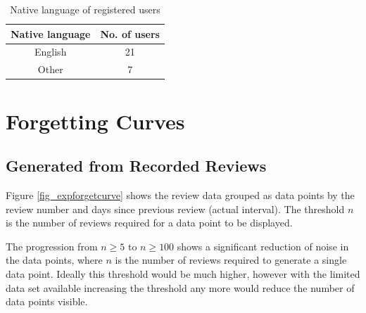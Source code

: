 \begin{table}[h!]
\caption{Native language of registered users}
\begin{tabular}{|c|c|}
\hline
Native language & No. of users \\
\hline
English & 21 \\
Other & 7 \\
\hline
\end{tabular}
\end{table}

\section{Forgetting Curves}
\subsection*{Generated from Recorded Reviews}

Figure \ref{fig_expforgetcurve} shows the review data grouped
as data points by the review number and days since previous review (actual interval).
The threshold $n$
is the number of reviews required for a data point to be displayed.

The progression from $n \geq 5$ to $n \geq 100$ shows a significant reduction of noise
in the data points, where $n$ is the number of reviews required to generate a single data
point. Ideally this threshold would be much higher, however with the limited data set
available increasing the threshold any more would reduce the number of data points
visible.

